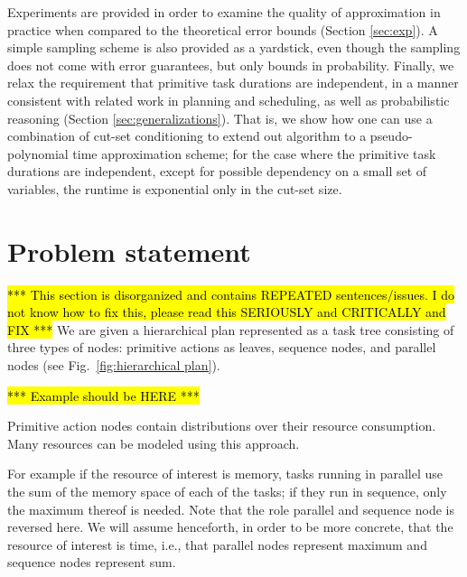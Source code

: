 \documentclass[review]{elsarticle}
\begin{document}
Experiments are provided in order to examine the quality of approximation in practice when compared to the theoretical 
error bounds (Section \ref{sec:exp}). A simple sampling scheme is also provided as a yardstick, even though the sampling does not come with error guarantees, but only bounds in probability. 
Finally, we relax the requirement that primitive task durations are independent, in a manner consistent with related work in planning and scheduling, as well as probabilistic 
reasoning (Section \ref{sec:generalizations}). That is, we show how one
can use a combination of cut-set conditioning to extend out algorithm to
a pseudo-polynomial time approximation scheme; for the case where the primitive task durations are independent, except for possible dependency on a small set of variables, the runtime is exponential only in the cut-set size.

\section{Problem statement}\label{sec:formal}

\hl{*** This section is disorganized and contains REPEATED
sentences/issues. I do not know how to fix this, please read this
SERIOUSLY and CRITICALLY and FIX ***}
We are given a hierarchical plan represented as a task tree consisting of three types of nodes: primitive actions as leaves, sequence nodes, and parallel nodes (see Fig.~\ref{fig:hierarchical plan}).

\hl{*** Example should be HERE ***}

Primitive action nodes contain distributions over their resource consumption. Many resources can be modeled using this approach. 
 
For example if the resource of interest is memory, tasks running in parallel use the sum of the memory space of each of the tasks; if they run in sequence, only the maximum thereof is needed. Note that the role parallel and sequence node is reversed here. We will assume henceforth, in order to be more concrete, that the resource of interest is time, i.e., that parallel nodes represent maximum and sequence nodes represent sum.
\end{document}
